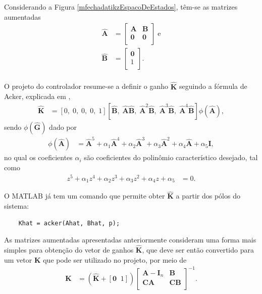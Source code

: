 Considerando a Figura \ref{mfechadatikzEspacoDeEstados}, têm-se as matrizes aumentadas \begin{align}
	\mathbf{\hat{A}} & = \left[\begin{array}{cc}
		\mathbf{A} & \mathbf{B}\\
		\mathbf{0} & \mathbf{0}\\
	\end{array}\right]\;\mathrm{e}\\
	\mathbf{\hat{B}} & = \left[\begin{array}{cc}
		\mathbf{0}\\
		1\\
	\end{array}\right].\\
\end{align}

O projeto do controlador resume-se a definir o ganho $\mathbf{\hat{K}}$ seguindo a fórmula de Acker, explicada em \cite{OgataDiscrete:1995}, \begin{align}
	\mathbf{\hat{K}} & = \left[0,\; 0,\; 0,\; 0,\; 1\right]\left[\mathbf{\hat{B}},\; \mathbf{\hat{A}}\mathbf{\hat{B}},\; \mathbf{\hat{A}}^2\mathbf{\hat{B}},\; \mathbf{\hat{A}}^3\mathbf{\hat{B}},\; \mathbf{\hat{A}}^4\mathbf{\hat{B}}\right]\phi(\mathbf{\hat{A}}),
\end{align} sendo $\phi(\mathbf{\hat{G}})$ dado por \begin{align}
	\phi(\mathbf{\hat{A}}) &= \mathbf{\hat{A}}^5 + \alpha_1 \mathbf{\hat{A}}^4 + \alpha_2 \mathbf{\hat{A}}^3 + \alpha_3 \mathbf{\hat{A}}^2 + \alpha_4 \mathbf{\hat{A}} + \alpha_5 \mathbf{I},
\end{align} no qual os coeficientes $\alpha_i$ são coeficientes do polinômio característico desejado, tal como \begin{align}
	z^5 + \alpha_1 z^4 + \alpha_2 z^3 + \alpha_3 z^2 + \alpha_4 z + \alpha_5 & =0.
\end{align}

O MATLAB já tem um comando que permite obter $\mathbf{\hat{K}}$ a partir dos pólos do sistema:\begin{lstlisting}
	Khat = acker(Ahat, Bhat, p);
\end{lstlisting}

As matrizes aumentadas apresentadas anteriormente consideram uma forma mais simples para obtenção do vetor de ganhos $\mathbf{\hat{K}}$, que deve ser então convertido para um vetor $\mathbf{K}$ que pode ser utilizado no projeto, por meio de \begin{align}
	\mathbf{K} &= \left(\mathbf{\hat{K}}+[\mathbf{0}\;\; 1]\right)\left[\begin{array}{cc}
	\mathbf{A}-\mathbf{I}_n & \mathbf{B}\\
	\mathbf{C}\mathbf{A} & \mathbf{C}\mathbf{B}\\
\end{array}
\right]^{-1}.\label{obterK}
\end{align}

